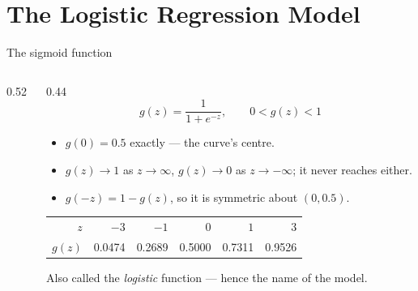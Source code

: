 \documentclass[aspectratio=169,10pt]{beamer}
\begin{document}
\section{The Logistic Regression Model}

\begin{frame}{The sigmoid function}
  \begin{columns}[T,onlytextwidth]
    \begin{column}{0.52\textwidth}
      \centering
    \end{column}
    \begin{column}{0.44\textwidth}
      \footnotesize
      \[ g(z) = \frac{1}{1+e^{-z}}, \qquad 0 < g(z) < 1 \]
      \begin{itemize}
        \item $g(0)=0.5$ exactly --- the curve's centre.
        \item $g(z)\to 1$ as $z\to\infty$, $g(z)\to 0$ as $z\to-\infty$; it never reaches
              either.
        \item $g(-z) = 1-g(z)$, so it is symmetric about $(0,0.5)$.
      \end{itemize}
      \vspace{1mm}
      \begin{center}\scriptsize
      \begin{tabular}{@{}rrrrrr@{}}
        \toprule
        $z$ & $-3$ & $-1$ & $0$ & $1$ & $3$\\
        $g(z)$ & 0.0474 & 0.2689 & 0.5000 & 0.7311 & 0.9526\\
        \bottomrule
      \end{tabular}
      \end{center}
      \vspace{1mm}
      Also called the \emph{logistic} function --- hence the name of the model.
    \end{column}
  \end{columns}
\end{frame}
\end{document}
